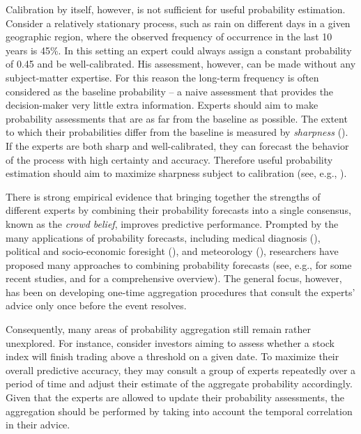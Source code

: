 \documentclass[aoas, preprint]{imsart}
\numberwithin{equation}{section}
\theoremstyle{plain}
\begin{document}
Calibration by itself, however, is not sufficient for useful probability estimation. Consider a relatively stationary process, such as rain on different days in a given geographic region, where the observed frequency of occurrence in the last 10 years is 45\%. In this setting an expert could always  assign a constant probability of 0.45 and be well-calibrated. His assessment, however, can be made without any subject-matter expertise. For this reason the long-term frequency is often considered as the baseline probability -- a naive assessment that provides the decision-maker very little extra information. Experts should aim to make probability assessments that are as far from the baseline as possible. The extent to which their probabilities differ from the baseline is measured by \textit{sharpness} (\citet{gneiting2008rejoinder, winkler2008comments}). If the experts are both sharp and well-calibrated, they can forecast the behavior of the process with high certainty and accuracy. Therefore useful probability estimation should aim to maximize sharpness subject to calibration (see, e.g., \citet{raftery2005using, murphy1987general}). 


There is strong empirical evidence that bringing together the strengths of different experts by combining their probability forecasts into a single consensus, known as the \textit{crowd belief},  improves predictive performance. Prompted by the many applications of probability forecasts, including medical diagnosis (\citet{wilson1998prediction, pepe2003statistical}), political and socio-economic foresight (\citet{tetlock2005expert}), and meteorology (\citet{sanders1963subjective, vislocky1995improved, baars2005performance}), researchers have proposed many approaches to combining probability forecasts 
(see, e.g., \citet{Ranjan08, satopaa, batchelder2010cultural} for some recent studies, and \citet{Genest, Wallsten97evaluatingand, clemen2007aggregating, primo2009calibration} for a comprehensive overview). The general focus, however, has been on developing one-time aggregation procedures that consult the experts' advice only once before the event resolves. 

Consequently, many areas of probability aggregation still remain rather unexplored. For instance, consider investors aiming to assess whether a stock index will finish trading above a threshold on a given date. To maximize their overall predictive accuracy, they may consult a group of experts repeatedly over a period of time and adjust their estimate of the aggregate probability accordingly. Given that the experts are allowed to update their probability assessments, the aggregation should be performed by taking into account the temporal correlation in their advice. 
\end{document}
